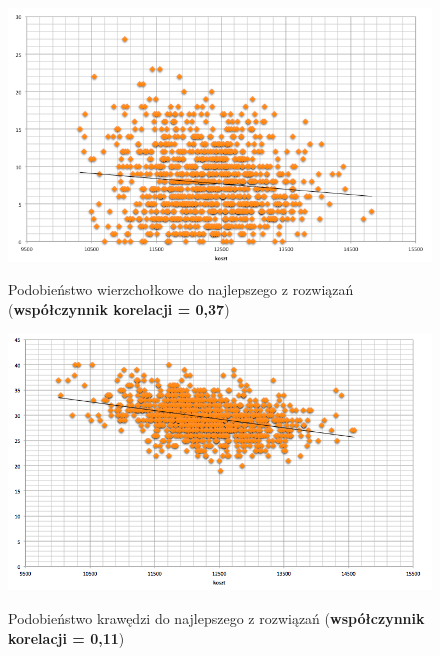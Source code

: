 \documentclass[a4paper 10pt]{article}
\begin{document}
\begin{figure} [H]
\centering
\caption{Podobieństwo wierzchołkowe do najlepszego z rozwiązań (\textbf{współczynnik korelacji = 0,37})}
\includegraphics[angle=0,width = 1\textwidth, height=!]{images/edge_best.png}
\label{Rys. Edges}
\end{figure}

\begin{figure} [H]
\centering
\caption{Podobieństwo krawędzi do najlepszego z rozwiązań (\textbf{współczynnik korelacji = 0,11})}
\includegraphics[angle=0,width = 1\textwidth, height=!]{images/node_best.png}
\label{Rys. Edges}
\end{figure}
\end{document}
